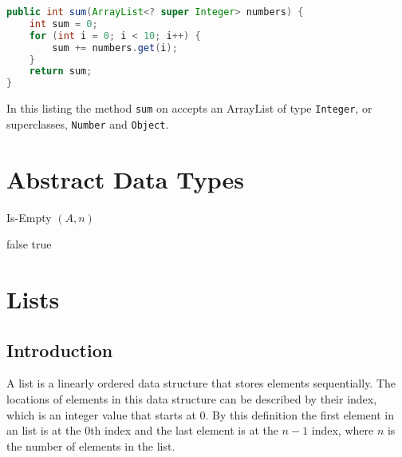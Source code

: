 \documentclass[12pt letter]{report}
\begin{document}
\begin{lstlisting}[language=Java]
public int sum(ArrayList<? super Integer> numbers) {
    int sum = 0;
    for (int i = 0; i < 10; i++) {
        sum += numbers.get(i);
    }
    return sum;
}
\end{lstlisting}

In this listing the method \lstinline{sum} on accepts an ArrayList of type \lstinline{Integer}, or superclasses,
\lstinline{Number} and \lstinline{Object}.

\chapter{Abstract Data Types}



\begin{algorithm}[H]
  \caption{Is-Empty $ \left( A, n \right) $}
  \begin{algorithmic}[1]
    \State \Return false
    \EndIf
    \State \Return true
    \EndFor
  \end{algorithmic}
\end{algorithm}


\chapter{Lists}

\section{Introduction}

A list is a linearly ordered data structure that stores elements sequentially. The locations of elements in this data
structure can be described by their index, which is an integer value that starts at 0. By this definition the first
element in an list is at the 0th index and the last element is at the $n-1$ index, where $n$ is the number of elements
in the list.
\end{document}
